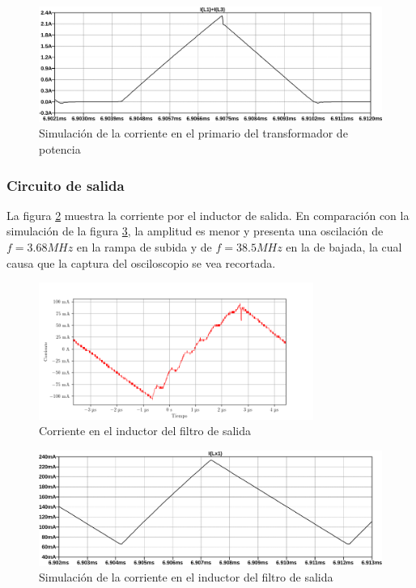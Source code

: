 \begin{figure}[H]
    \centering
    \includegraphics[width=\textwidth]{images/sim/12.pdf}
    \caption{Simulación de la corriente en el primario del transformador de potencia}
    \label{fig:sim:12}
\end{figure}

\subsubsection{Circuito de salida}

La figura \ref{fig:osc:66} muestra la corriente por el inductor de salida. 
En comparación con la simulación de la figura \ref{fig:sim:13}, 
la amplitud es menor y presenta una oscilación de $f=3.68MHz$ en la rampa de subida y de $f=38.5MHz$ en la de bajada, la cual causa que la captura del osciloscopio se vea recortada. 

\begin{figure}[H]
    \centering
    \includegraphics[width=0.8\textwidth]{images/capturas-osciloscopio/17-11-2022/66.png}
    \caption{Corriente en el inductor del filtro de salida}
    \label{fig:osc:66}
\end{figure}

\begin{figure}[H]
    \centering
    \includegraphics[width=\textwidth]{images/sim/13.pdf}
    \caption{Simulación de la corriente en el inductor del filtro de salida}
    \label{fig:sim:13}
\end{figure}

